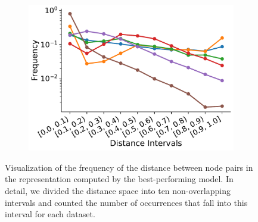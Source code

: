 \begin{figure}[!htb]
	\centering
	\begin{subfigure}[t]{0.45\textwidth}
		\centering
		\includegraphics[width=\textwidth]{Figures/global_error_distances.pdf}
	\end{subfigure}
	\begin{subfigure}[t]{0.2\textwidth}
		\centering
	\end{subfigure}
	\caption{Visualization of the frequency of the distance between node pairs in the representation computed by the best-performing \gnn model. In detail, we divided the distance space into ten non-overlapping intervals and counted the number of occurrences that fall into this interval for each dataset.}
	\label{fig:approx_error_dist}
\end{figure}

